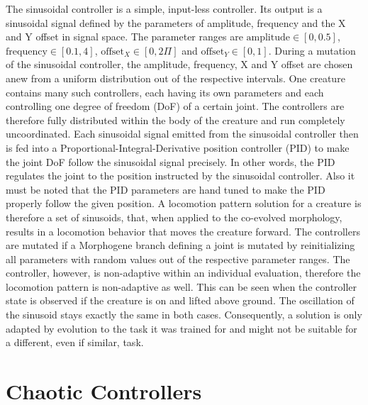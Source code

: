 \documentclass[main]{subfiles}
\begin{document}
The sinusoidal controller is a simple, input-less controller. %
%
Its output is a sinusoidal signal defined by the parameters of amplitude, frequency and the X and Y offset in signal space. %
%
The parameter ranges are $\text{amplitude} \in [0,0.5]$, $\text{frequency} \in [0.1,4]$, $\text{offset}_X \in [0,2\Pi]$ and $\text{offset}_Y \in [0,1]$. %
%
During a mutation of the sinusoidal controller, the amplitude, frequency, X and Y offset are chosen anew from a uniform distribution out of the respective intervals. %
%
One creature contains many such controllers, each having its own parameters and each controlling one degree of freedom (DoF) of a certain joint. %
%
The controllers are therefore fully distributed within the body of the creature and run completely uncoordinated. %
%
Each sinusoidal signal emitted from the sinusoidal controller then is fed into a Proportional-Integral-Derivative position controller (PID) to make the joint DoF follow the sinusoidal signal precisely. %
%
In other words, the PID regulates the joint to the position instructed by the sinusoidal controller. %
%
Also it must be noted that the PID parameters are hand tuned to make the PID properly follow the given position. %
%
A locomotion pattern solution for a creature is therefore a set of sinusoids, that, when applied to the co-evolved morphology, results in a locomotion behavior that moves the creature forward. %
%
The controllers are mutated if a Morphogene branch defining a joint is mutated by reinitializing all parameters with random values out of the respective parameter ranges. %
%
The controller, however, is non-adaptive within an individual evaluation, therefore the locomotion pattern is non-adaptive as well. %
%
This can be seen when the controller state is observed if the creature is on and lifted above ground. %
%
The oscillation of the sinusoid stays exactly the same in both cases. %
%
Consequently, a solution is only adapted by evolution to the task it was trained for and might not be suitable for a different, even if similar, task.

\section{Chaotic Controllers}
\label{sec:chaotic-controllers}
\end{document}
